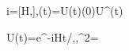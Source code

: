 i\hbar{}=[H,\rho],\qquad \rho(t)=U(t)\rho(0)U^\dagger(t)

U(t)=e^{-iHt/\hbar},\qquad {},\qquad {}\rho^2=
